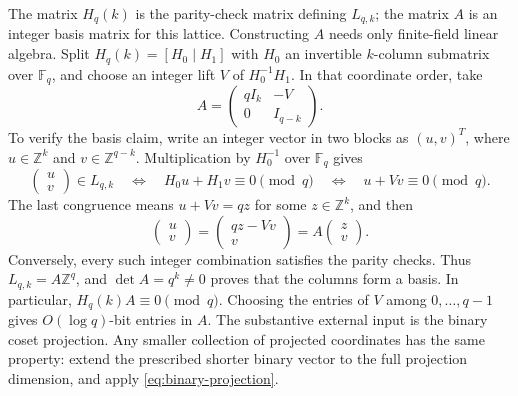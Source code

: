 \documentclass[11pt,letterpaper]{article}
\numberwithin{equation}{section}
\theoremstyle{definition}
\theoremstyle{remark}
\newcommand{\Z}{\mathbb Z}
\newcommand{\F}{\mathbb F}
\begin{document}
The matrix $H_q(k)$ is the parity-check matrix defining $L_{q,k}$; the matrix $A$ is an integer basis matrix for this lattice. Constructing $A$ needs only finite-field linear algebra. Split $H_q(k)=[H_0\mid H_1]$ with $H_0$ an invertible $k$-column submatrix over $\F_q$, and choose an integer lift $V$ of $H_0^{-1}H_1$. In that coordinate order, take
\begin{equation}\label{eq:gadget-basis}
 A=\begin{pmatrix}qI_k&-V\\0&I_{q-k}\end{pmatrix}.
\end{equation}
To verify the basis claim, write an integer vector in two blocks as $(u,v)^T$, where $u\in\Z^k$ and $v\in\Z^{q-k}$. Multiplication by $H_0^{-1}$ over $\F_q$ gives
\[
 \begin{pmatrix}u\\v\end{pmatrix}\in L_{q,k}
 \quad\Longleftrightarrow\quad H_0u+H_1v\equiv0\pmod q
 \quad\Longleftrightarrow\quad u+Vv\equiv0\pmod q.
\]
The last congruence means $u+Vv=qz$ for some $z\in\Z^k$, and then
\[
 \begin{pmatrix}u\\v\end{pmatrix}
 =\begin{pmatrix}qz-Vv\\v\end{pmatrix}
 =A\begin{pmatrix}z\\v\end{pmatrix}.
\]
Conversely, every such integer combination satisfies the parity checks. Thus $L_{q,k}=A\Z^q$, and $\det A=q^k\ne0$ proves that the columns form a basis. In particular, $H_q(k)A\equiv0\pmod q$. Choosing the entries of $V$ among $0,\ldots,q-1$ gives $O(\log q)$-bit entries in $A$. The substantive external input is the binary coset projection. Any smaller collection of projected coordinates has the same property: extend the prescribed shorter binary vector to the full projection dimension, and apply \eqref{eq:binary-projection}.
\end{document}
